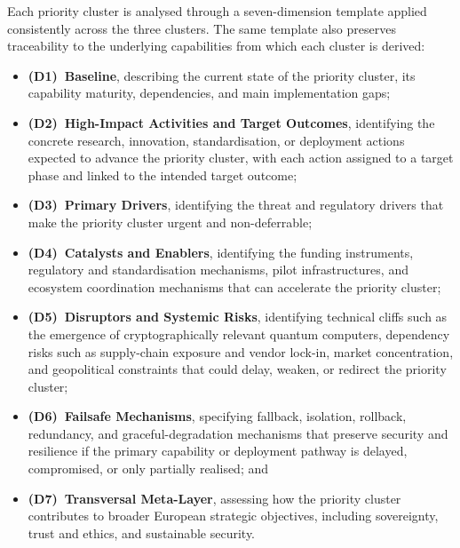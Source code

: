 \documentclass{ieeeaccess}
\begin{document}
Each priority cluster is analysed through a seven-dimension template applied consistently across the three clusters. The same template also preserves traceability to the underlying capabilities from which each cluster is derived:
\begin{itemize}
    \item \textbf{(D1)~Baseline}, describing the current state of the priority cluster, its capability maturity, dependencies, and main implementation gaps;
    \item \textbf{(D2)~High-Impact Activities and Target Outcomes}, identifying the concrete research, innovation, standardisation, or deployment actions expected to advance the priority cluster, with each action assigned to a target phase and linked to the intended target outcome;
    \item \textbf{(D3)~Primary Drivers}, identifying the threat and regulatory drivers that make the priority cluster urgent and non-deferrable;
    \item \textbf{(D4)~Catalysts and Enablers}, identifying the funding instruments, regulatory and standardisation mechanisms, pilot infrastructures, and ecosystem coordination mechanisms that can accelerate the priority cluster;
    \item \textbf{(D5)~Disruptors and Systemic Risks}, identifying technical cliffs such as the emergence of cryptographically relevant quantum computers, dependency risks such as supply-chain exposure and vendor lock-in, market concentration, and geopolitical constraints that could delay, weaken, or redirect the priority cluster;
    \item \textbf{(D6)~Failsafe Mechanisms}, specifying fallback, isolation, rollback, redundancy, and graceful-degradation mechanisms that preserve security and resilience if the primary capability or deployment pathway is delayed, compromised, or only partially realised; and
    \item \textbf{(D7)~Transversal Meta-Layer}, assessing how the priority cluster contributes to broader European strategic objectives, including sovereignty, trust and ethics, and sustainable security.
\end{itemize}
\end{document}
